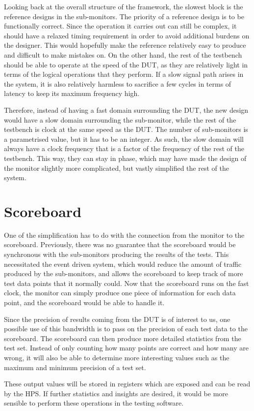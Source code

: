 Looking back at the overall structure of the framework, the slowest block is the reference designs in the sub-monitors.
The priority of a reference design is to be functionally correct.
Since the operation it carries out can still be complex, it should have a relaxed timing requirement in order to avoid additional burdens on the designer.
This would hopefully make the reference relatively easy to produce and difficult to make mistakes on.
On the other hand, the rest of the testbench should be able to operate at the speed of the DUT, as they are relatively light in terms of the logical operations that they perform.
If a slow signal path arises in the system, it is also relatively harmless to sacrifice a few cycles in terms of latency to keep its maximum frequency high.

Therefore, instead of having a fast domain surrounding the DUT, the new design would have a slow domain surrounding the sub-monitor, while the rest of the testbench is clock at the same speed as the DUT.
The number of sub-monitors is a parametrised value, but it has to be an integer.
As such, the slow domain will always have a clock frequency that is a factor of the frequency of the rest of the testbench.
This way, they can stay in phase, which may have made the design of the monitor slightly more complicated, but vastly simplified the rest of the system.

\section{Scoreboard}
One of the simplification has to do with the connection from the monitor to the scoreboard.
Previously, there was no guarantee that the scoreboard would be synchronous with the sub-monitors producing the results of the tests.
This necessitated the event driven system, which would reduce the amount of traffic produced by the sub-monitors, and allows the scoreboard to keep track of more test data points that it normally could.
Now that the scoreboard runs on the fast clock, the monitor can simply produce one piece of information for each data point, and the scoreboard would be able to handle it.

Since the precision of results coming from the DUT is of interest to us, one possible use of this bandwidth is to pass on the precision of each test data to the scoreboard.
The scoreboard can then produce more detailed statistics from the test set.
Instead of only counting how many points are correct and how many are wrong, it will also be able to determine more interesting values such as the maximum and minimum precision of a test set.

These output values will be stored in registers which are exposed and can be read by the HPS.
If further statistics and insights are desired, it would be more sensible to perform these operations in the testing software.
